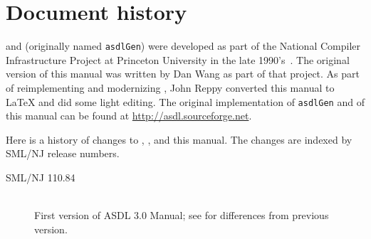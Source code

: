 %
\chapter{Document history}
\label{ch:history}

\asdl{} and \asdlgen{} (originally named \texttt{asdlGen}) were developed as part
of the National Compiler Infrastructure Project at Princeton University in the
late 1990's~\cite{usenix:zephyr-asdl}.
The original version of this manual was written by Dan Wang as part of that project.
As part of reimplementing and modernizing \asdl{}, John Reppy converted this manual
to \LaTeX{} and did some light editing.
The original implementation of \texttt{asdlGen} and of this manual can be
found at \url{http://asdl.sourceforge.net}.

Here is a history of changes to \asdl{}, \asdlgen{}, and this manual.
The changes are indexed by SML/NJ release numbers.

\begin{description}
  \item[SML/NJ 110.84]
    \mbox{}\\[0.5em]
    First version of ASDL 3.0 Manual; see  for differences from previous
    version.
\end{description}%
